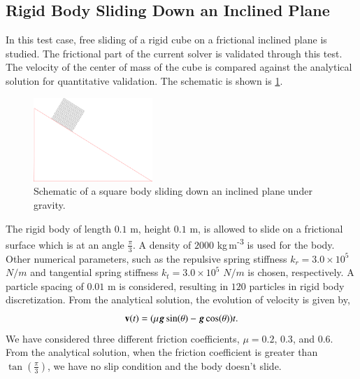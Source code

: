\subsection{Rigid Body Sliding Down an Inclined Plane}
\label{sec:rigid-body-sliding}
In this test case, free sliding of a rigid cube on a frictional inclined plane
is studied. The frictional part of the current solver is validated through this
test. The velocity of the center of mass of the cube is compared against the
analytical solution for quantitative validation. The schematic is shown is
\cref{fig:rigid_body_sliding}.
\begin{figure}[!htpb]
  \centering
  \includegraphics[width=0.4\textwidth]{images/rfc/images/rigid_body_sliding/schematic}
  \caption{Schematic of a square body sliding down an inclined plane under gravity.}
\label{fig:rigid_body_sliding}
\end{figure}
The rigid body of length $0.1$ m, height $0.1$ m, is allowed to slide on a
frictional surface which is at an angle $\frac{\pi}{3}$. A density of $2000$
kg\,m\textsuperscript{-3} is used for the body. Other numerical parameters, such
as the repulsive spring stiffness $k_r=3.0 \times 10^{5}$ $N/m$ and tangential
spring stiffness $k_t=3.0 \times 10^{5}$ $N/m$ is chosen, respectively. A
particle spacing of $0.01$ m is considered, resulting in $120$ particles in
rigid body discretization. From the analytical solution, the evolution of
velocity is given by,
\begin{equation}
  \label{eq:rfc:ce}
  \mathbf{v}(t) = (\mu \boldsymbol{g} \sin (\theta) - \boldsymbol{g} \cos (\theta)) t.
\end{equation}
We have considered three different friction coefficients, $\mu=0.2$,
$0.3$, and $0.6$. From the analytical solution, when the friction
coefficient is greater than $\tan(\frac{\pi}{3})$, we have no slip condition
and the body doesn't slide.


